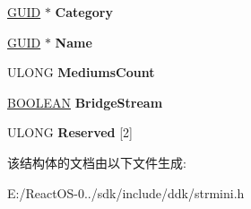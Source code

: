 \begin{DoxyCompactItemize}
\hyperlink{interface_g_u_i_d}{G\+U\+ID} $\ast$ {\bfseries Category}
\item 
\mbox{\label{struct___h_w___s_t_r_e_a_m___i_n_f_o_r_m_a_t_i_o_n_a7474848ec4ad8b42f10a9f227f0ca412}} 
\hyperlink{interface_g_u_i_d}{G\+U\+ID} $\ast$ {\bfseries Name}
\item 
\mbox{\label{struct___h_w___s_t_r_e_a_m___i_n_f_o_r_m_a_t_i_o_n_a0cb7eb3d30b426de2c391053038693e8}} 
U\+L\+O\+NG {\bfseries Mediums\+Count}
\item 
\mbox{\label{struct___h_w___s_t_r_e_a_m___i_n_f_o_r_m_a_t_i_o_n_ac40530a1cad95a4dde4e81a5eef6a01a}} 
\hyperlink{_processor_bind_8h_a112e3146cb38b6ee95e64d85842e380a}{B\+O\+O\+L\+E\+AN} {\bfseries Bridge\+Stream}
\item 
\mbox{\label{struct___h_w___s_t_r_e_a_m___i_n_f_o_r_m_a_t_i_o_n_af20d2bbe3e1c9ee8d3a2273360ae1d10}} 
U\+L\+O\+NG {\bfseries Reserved} \mbox{[}2\mbox{]}
\end{DoxyCompactItemize}


该结构体的文档由以下文件生成\+:\begin{DoxyCompactItemize}
\item 
E\+:/\+React\+O\+S-\/0../sdk/include/ddk/strmini.\+h\end{DoxyCompactItemize}
